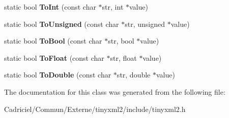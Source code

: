 \begin{DoxyCompactItemize}
\item 
static bool {\bfseries To\+Int} (const char $\ast$str, int $\ast$value)\hypertarget{classtinyxml2_1_1_x_m_l_util_ac7fa220dd1c428ed6a77850d56a6e4bf}{}\label{classtinyxml2_1_1_x_m_l_util_ac7fa220dd1c428ed6a77850d56a6e4bf}

\item 
static bool {\bfseries To\+Unsigned} (const char $\ast$str, unsigned $\ast$value)\hypertarget{classtinyxml2_1_1_x_m_l_util_a46f7e9542929001e726853ed8b571c07}{}\label{classtinyxml2_1_1_x_m_l_util_a46f7e9542929001e726853ed8b571c07}

\item 
static bool {\bfseries To\+Bool} (const char $\ast$str, bool $\ast$value)\hypertarget{classtinyxml2_1_1_x_m_l_util_ae1692c644a807da2cd9e1e45f79a102f}{}\label{classtinyxml2_1_1_x_m_l_util_ae1692c644a807da2cd9e1e45f79a102f}

\item 
static bool {\bfseries To\+Float} (const char $\ast$str, float $\ast$value)\hypertarget{classtinyxml2_1_1_x_m_l_util_ac13b56b82e7f1d2d3954666b76c67d22}{}\label{classtinyxml2_1_1_x_m_l_util_ac13b56b82e7f1d2d3954666b76c67d22}

\item 
static bool {\bfseries To\+Double} (const char $\ast$str, double $\ast$value)\hypertarget{classtinyxml2_1_1_x_m_l_util_a7e37ab30ba19c2b02042ab093172e9b8}{}\label{classtinyxml2_1_1_x_m_l_util_a7e37ab30ba19c2b02042ab093172e9b8}

\end{DoxyCompactItemize}


The documentation for this class was generated from the following file\+:\begin{DoxyCompactItemize}
\item 
Cadriciel/\+Commun/\+Externe/tinyxml2/include/tinyxml2.\+h\end{DoxyCompactItemize}
